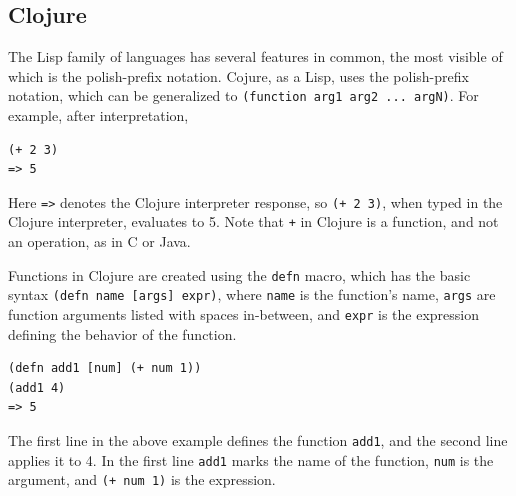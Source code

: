 \documentclass[12pt]{article}
\newcommand{\comment}[1]{{\bf \tt  {#1}}}
\newcommand{\emcomment}[1]{\textcolor{ForestGreen}{\comment{Elena: {#1}}}}
\newcommand{\clocode}[1]{{\texttt {#1}}}
\begin{document}
\subsection{Clojure}\label{sec:clojure}
The Lisp family of languages has several features in common, the most visible of which is the polish-prefix notation. Cojure, as a Lisp, uses the polish-prefix notation, which can be generalized to \clocode{(function arg1 arg2 ... argN)}. For example, after interpretation, 
\begin{verbatim}
(+ 2 3)
=> 5
\end{verbatim}
Here \clocode{=>} denotes the Clojure interpreter response, so \clocode{(+ 2 3)}, when typed in the Clojure interpreter, evaluates to 5. 
Note that \clocode{+} in Clojure is a function, and not an operation, as in C or Java. 

Functions in Clojure are created using the \clocode{defn} macro, which has the basic syntax \clocode{(defn name [args] expr)}, where \clocode{name} is the function's name, \clocode{args} are function arguments listed with spaces in-between, and \clocode{expr} is the expression defining the behavior of the function. 
\begin{verbatim}
(defn add1 [num] (+ num 1))
(add1 4)
=> 5
\end{verbatim} 
The first line in the above example defines the function \clocode{add1}, and the second line applies it to 4. In the first line \clocode{add1} marks the name of the function, \clocode{num} is the argument, and \clocode{(+ num 1)} is the expression.
\end{document}
